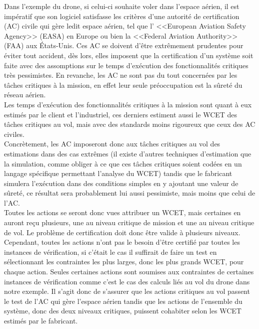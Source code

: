 \documentclass[a4paper]{report}
\theoremstyle{break}
\begin{document}
Dans l'exemple du drone, si celui-ci souhaite voler dans l'espace aérien, il est impératif que son logiciel satisfasse les critères d'une autorité de certification (AC) civile qui gère ledit espace aérien, tel que l’ <<European Aviation Safety Agency>> (EASA) en Europe ou bien la <<Federal Aviation Authority>> (FAA) aux États-Unis. Ces AC se doivent d'être extrêmement prudentes pour éviter tout accident, dès lors, elles imposent que la certification d'un système soit faite avec des assomptions sur le temps d'exécution des fonctionnalités critiques très pessimistes. En revanche, les AC ne sont pas du tout concernées par les tâches critiques à la mission, en effet leur seule préoccupation est la sûreté du réseau aérien.\\
Les temps d'exécution des fonctionnalités critiques à la mission sont quant à eux estimés par le client et l'industriel, ces derniers estiment aussi le WCET des tâches critiques au vol, mais avec des standards moins rigoureux que ceux des AC civiles.\\

Concrètement, les AC imposeront donc aux tâches critiques au vol des estimations dans des cas extrêmes (il existe d'autres techniques d'estimation que la simulation, comme obliger à ce que ces tâches critiques soient codées en un langage spécifique permettant l'analyse du WCET) tandis que le fabricant simulera l'exécution dans des conditions simples en y ajoutant une valeur de sûreté, ce résultat sera probablement lui aussi pessimiste, mais moins que celui de l'AC.\\

Toutes les actions se seront donc vues attribuer un WCET, mais certaines en auront reçu plusieurs, une au niveau critique de mission et une au niveau critique de vol. Le problème de certification doit donc être valide à plusieurs niveaux. Cependant, toutes les actions n'ont pas le besoin d'être certifié par toutes les instances de vérification, si c'était le cas il suffirait de faire un test en sélectionnant les contraintes les plus larges, donc les plus grands WCET, pour chaque action. Seules certaines actions sont soumises aux contraintes de certaines instances de vérification comme c'est le cas des calculs liés au vol du drone dans notre exemple. Il s'agit donc de s'assurer que les actions critiques au vol passent le test de l'AC qui gère l'espace aérien tandis que les actions de l'ensemble du système, donc des deux niveaux critiques, puissent cohabiter selon les WCET estimés par le fabricant.\\
\end{document}
